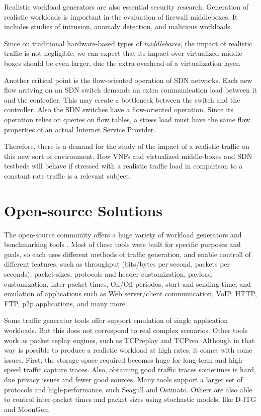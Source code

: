 Realistic workload generators are also essential security research\cite{ditg-paper}.  Generation of realistic workloads is important in the evaluation of firewall middleboxes. It includes studies of intrusion, anomaly detection, and malicious workloads\cite{ditg-paper}. 

Since on traditional hardware-based types of \textit{middleboxes}, the impact of realistic traffic is not negligible; we can expect that its impact over virtualized middle-boxes should be even larger, due the extra overhead of a virtualization layer. 


Another critical point is the flow-oriented operation of SDN networks. Each new flow arriving on an SDN switch demands an extra communication load between it and the controller. This may create a bottleneck between the switch and the controller.  Also the SDN switches have a flow-oriented operation. Since its operation relies on queries on flow tables, a stress load must have the same flow properties of an actual Internet Service Provider.


Therefore, there is a demand for the study of the impact of a realistic traffic on this new sort of environment. How VNFs and virtualized middle-boxes and SDN testbeds will behave if stressed with a realistic traffic load in comparison to a constant rate traffic is a relevant subject. 


\section{Open-source Solutions}


The open-source community offers a huge variety of workload generators and benchmarking tools \cite{ditg-paper}\cite{validate-trafficgen}\cite{comparative-trafficgen-tools}\cite{performance-trafficgen}. Most of these tools were built for specific purposes and goals, so each uses different methods of traffic generation, and enable controll of different features, such as throughput (bits/bytes per second, packets per seconds), packet-sizes, protocols and header customization, payload customization, inter-packet times, On/Off periodos, start and sending time, and emulation of applications such as Web server/client communication, VoIP, HTTP, FTP, p2p applications, and many more.


Some traffic generator tools offer support emulation of single application workloads. But this does not correspond to real complex scenarios. Other tools work as packet replay engines, such as TCPreplay and TCPivo. Although in that way is possible to produce a realistic workload at high rates, it comes with some issues. First, the storage space required becomes huge for long-term and high-speed traffic capture traces. Also, obtaining good traffic traces sometimes is hard, due privacy issues and fewer good sources. Many tools support a larger set of protocols and high-performance, such Seagull and Ostinato. Others are also able to control inter-packet times and packet sizes using stochastic models, like D-ITG\cite{ditg-paper} and MoonGen. 


